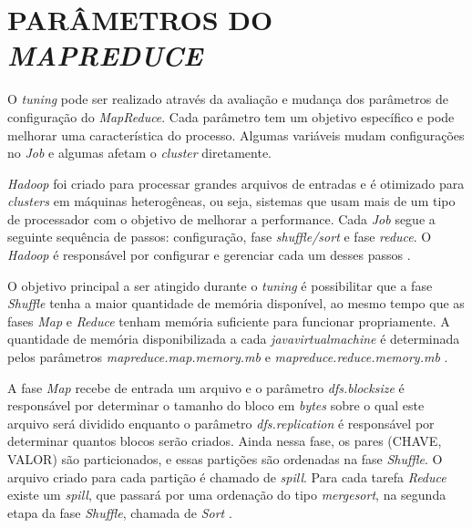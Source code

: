 \section{PARÂMETROS DO \textit{MAPREDUCE}} \label{sec:parametrosmapreduce}

O \textit{\gls{tuning}} pode ser realizado através da avaliação e mudança dos parâmetros de configuração do \textit{MapReduce}. Cada parâmetro tem um objetivo específico e pode melhorar uma característica do processo. Algumas variáveis mudam configurações no \textit{Job} e algumas afetam o \textit{cluster} diretamente.

\textit{Hadoop} foi criado para processar grandes arquivos de entradas e é otimizado para \textit{clusters} em máquinas heterogêneas, ou seja, sistemas que usam mais de um tipo de processador com o objetivo de melhorar a performance. Cada \textit{Job} segue a seguinte sequência de passos: configuração, fase \textit{shuffle/sort} e fase \textit{reduce}. O \textit{Hadoop} é responsável por configurar e gerenciar cada um desses passos \cite{ProHadoop09}.



O objetivo principal a ser atingido durante o \textit{\gls{tuning}} é possibilitar que a fase \textit{Shuffle} tenha a maior quantidade de memória disponível, ao mesmo tempo que as fases \textit{Map} e \textit{Reduce} tenham memória suficiente para funcionar propriamente. A quantidade de memória disponibilizada a cada \textit{\gls{javavirtualmachine}} é determinada pelos parâmetros \textit{mapreduce.map.memory.mb} e \textit{mapreduce.reduce.memory.mb} \cite{HadoopBook15}.

A fase \textit{Map} recebe de entrada um arquivo e o parâmetro \textit{dfs.blocksize} é responsável por determinar o tamanho do bloco em \textit{\gls{byte}s} sobre o qual este arquivo será dividido enquanto o parâmetro \textit{dfs.replication} é responsável por determinar quantos blocos serão criados. Ainda nessa fase, os pares (CHAVE, VALOR) são particionados, e essas partições são ordenadas na fase \textit{Shuffle}. O arquivo criado para cada partição é chamado de \textit{spill}. Para cada tarefa \textit{Reduce} existe um \textit{spill}, que passará por uma ordenação do tipo \textit{\gls{mergesort}}, na segunda etapa da fase \textit{Shuffle}, chamada de \textit{Sort} \cite{ProHadoop09}.

